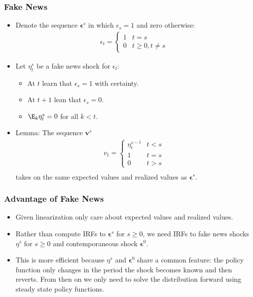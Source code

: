 \documentclass[english,xcolor=svgnames]{beamer}
\begin{document}
\begin{frame}
    \frametitle{Fake News}
    \begin{itemize}
    	\item Denote the sequence $\bm{\epsilon}^s$ in which $\epsilon_s=1$ and zero otherwise:
        \begin{align*}
    		\epsilon_t = \begin{cases}
    			1 & t=s \\
    			0 & t\ge0, t\neq s
    		\end{cases}
    	\end{align*}
        \item Let $\eta_t^s$ be a fake news shock for $\epsilon_t$:
        \begin{itemize}
        	\item At $t$ learn that $\epsilon_{s}=1$ with certainty.
        	\item At $t+1$ lean that $\epsilon_{s}=0$.
        	\item $\E_{k}\eta_t^s=0$ for all $k<t$.
        \end{itemize}
        \item Lemma: The sequence $\bm{v}^s$
        \begin{align*}
    		\nu_t = \begin{cases}
    			\eta_t^{s-t} & t<s \\
    			1 & t= s \\
    			0 & t>s
    		\end{cases}\\
    	\end{align*}
        takes on the same expected values and realized values as $\bm{\epsilon}^s$.
	\end{itemize}
\end{frame}


\begin{frame}
    \frametitle{Advantage of Fake News}
    \begin{itemize}
    	\item Given linearization only care about expected values and realized values.
    	\item Rather than compute IRFs to $\bm{\epsilon}^s$ for $s\ge 0$, we need IRFs to fake news shocks $\eta^s$ for $s\ge 0$ and contemporaneous shock $\bm{\epsilon}^0$.
    	\item This is more efficient because $\eta^s$ and $\bm{\epsilon}^0$ share a common feature: the policy function only changes in the period the shock becomes known and then reverts. From then on we only need to solve the distribution forward using steady state policy functions.
	\end{itemize}
\end{frame}
\end{document}
